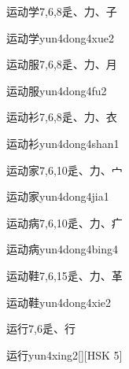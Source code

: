\begin{entry}{运动学}{7,6,8}{⾡、⼒、⼦}
  \begin{phonetics}{运动学}{yun4dong4xue2}
  \end{phonetics}
\end{entry}

\begin{entry}{运动服}{7,6,8}{⾡、⼒、⽉}
  \begin{phonetics}{运动服}{yun4dong4fu2}
  \end{phonetics}
\end{entry}

\begin{entry}{运动衫}{7,6,8}{⾡、⼒、⾐}
  \begin{phonetics}{运动衫}{yun4dong4shan1}
  \end{phonetics}
\end{entry}

\begin{entry}{运动家}{7,6,10}{⾡、⼒、⼧}
  \begin{phonetics}{运动家}{yun4dong4jia1}
  \end{phonetics}
\end{entry}

\begin{entry}{运动病}{7,6,10}{⾡、⼒、⽧}
  \begin{phonetics}{运动病}{yun4dong4bing4}
  \end{phonetics}
\end{entry}

\begin{entry}{运动鞋}{7,6,15}{⾡、⼒、⾰}
  \begin{phonetics}{运动鞋}{yun4dong4xie2}
  \end{phonetics}
\end{entry}

\begin{entry}{运行}{7,6}{⾡、⾏}
  \begin{phonetics}{运行}{yun4xing2}[][HSK 5]
  \end{phonetics}
\end{entry}

